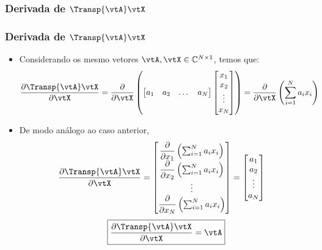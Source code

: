 \subsubsection{Derivada de $\Transp{\vtA} \vtX$}
\begin{frame}
	\frametitle{\normalsize Derivada de $\Transp{\vtA} \vtX$}
	\begin{itemize}
		\item Considerando os mesmo vetores $\vtA, \vtX \in \mathbb{C}^{N \times 1}$, temos que:
		{\tiny
		\begin{align*}
			\frac{\partial \Transp{\vtA} \vtX}{\partial \vtX} &= \frac{\partial}{\partial \vtX} \left(
			\begin{bmatrix}
				a_1 & a_2 & \dots & a_N
			\end{bmatrix} \begin{bmatrix}
				x_{1} \\ x_{2} \\ \vdots \\ x_{N}
			\end{bmatrix} \right)
			= \frac{\partial}{\partial \vtX} \left( \sum_{i = 1}^N a_ix_i \right)
		\end{align*}}
		\item De modo análogo ao caso anterior,
		{\tiny
		\begin{align*}
			\frac{\partial \Transp{\vtA} \vtX}{\partial \vtX} &= \begin{bmatrix}
				\dfrac{\partial}{\partial x_1} \left( \sum_{i = 1}^N a_ix_i \right) \\ \dfrac{\partial}{\partial x_2} \left( \sum_{i = 1}^N a_ix_i \right) \\ \vdots \\ \dfrac{\partial}{\partial x_N} \left( \sum_{i = 1}^N a_ix_i \right) 
			\end{bmatrix} 
			= \begin{bmatrix}
				a_1 \\ a_2 \\ \vdots \\ a_N
			\end{bmatrix}
		\end{align*}}
		\[
			\boxed{\frac{\partial \Transp{\vtA} \vtX}{\partial \vtX} = \vtA}
		\]
	\end{itemize}
\end{frame}

